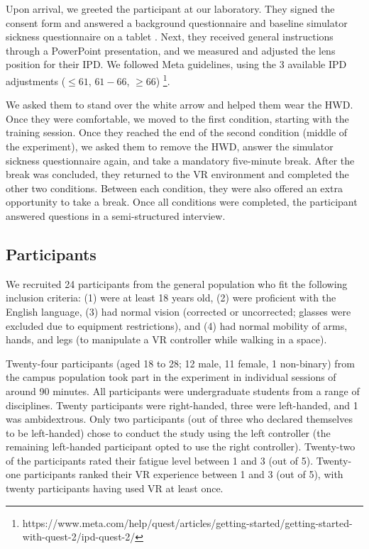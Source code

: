 Upon arrival, we greeted the participant at our laboratory. They signed the consent form and answered a background questionnaire and baseline simulator sickness questionnaire on a tablet \cite{kennedy_simulator_1993}. Next, they received general instructions through a PowerPoint presentation, and we measured and adjusted the lens position for their IPD. We followed Meta guidelines, using the 3 available IPD adjustments ($\leq61$, $61-66$, $\geq66$) \footnote{https://www.meta.com/help/quest/articles/getting-started/getting-started-with-quest-2/ipd-quest-2/}.

We asked them to stand over the white arrow and helped them wear the HWD. Once they were comfortable, we moved to the first condition, starting with the training session. Once they reached the end of the second condition (middle of the experiment), we asked them to remove the HWD, answer the simulator sickness questionnaire again, and take a mandatory five-minute break. After the break was concluded, they returned to the VR environment and completed the other two conditions. Between each condition, they were also offered an extra opportunity to take a break. Once all conditions were completed, the participant answered questions in a semi-structured interview.

\subsection{Participants}
We recruited 24 participants from the general population who fit the following inclusion criteria: (1) were at least 18 years old, (2) were proficient with the English language, (3) had normal vision (corrected or uncorrected; glasses were excluded due to equipment restrictions), and (4) had normal mobility of arms, hands, and legs (to manipulate a VR controller while walking in a space).

Twenty-four participants (aged 18 to 28; 12 male, 11 female, 1 non-binary) from the campus population took part in the experiment in individual sessions of around 90 minutes. All participants were undergraduate students from a range of disciplines. Twenty participants were right-handed, three were left-handed, and 1 was ambidextrous. Only two participants (out of three who declared themselves to be left-handed) chose to conduct the study using the left controller (the remaining left-handed participant opted to use the right controller). Twenty-two of the participants rated their fatigue level between 1 and 3 (out of 5). Twenty-one participants ranked their VR experience between 1 and 3 (out of 5), with twenty participants having used VR at least once.


